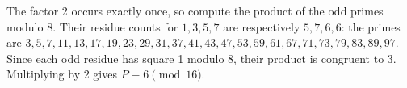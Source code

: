 The factor 2 occurs exactly once, so compute the product of the odd primes modulo 8. Their residue counts for $ 1,3,5,7 $ are respectively $ 5,7,6,6 $: the primes are $ 3,5,7,11,13,17,19,23,29,31,37,41,43,47,53,59,61,67,71,73,79,83,89,97 $. Since each odd residue has square 1 modulo 8, their product is congruent to $ 3 $. Multiplying by 2 gives $\boxed{P\equiv6\pmod{16}}$.
